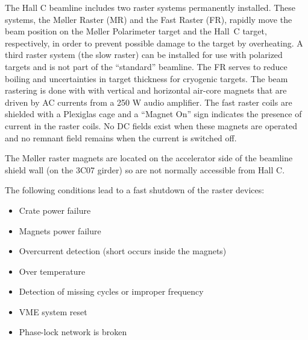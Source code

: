 


\begin{safetyen}{0}{0}

The Hall C beamline includes two raster systems permanently installed.
These systems, the M\o ller Raster (MR) and the Fast Raster (FR),
rapidly move the beam position on the M\o ller Polarimeter target and
the Hall~C target, respectively, in order to prevent possible damage
to the target by overheating. A third raster system (the slow raster)
can be installed for use with polarized targets and is not part of the
``standard'' beamline. 
 The FR serves to reduce boiling and uncertainties in target
thickness for cryogenic targets.  The beam rastering is done with with
vertical and horizontal air-core magnets that are driven by AC
currents from a 250 W audio amplifier. The fast raster coils are
shielded with a Plexiglas cage and a ``Magnet On'' sign indicates the
presence of current in the raster coils.
No DC fields exist when these magnets are operated and no remnant
field remains when the current is switched off.

The M\o ller raster magnets are located on the accelerator side of the
beamline shield wall (on the 3C07 girder) so are not normally
accessible from Hall C.

The following conditions lead to a fast shutdown of the raster devices:
\begin{itemize}
\item{Crate power failure}
\item{Magnets power failure}
\item{Overcurrent detection (short occurs inside the magnets)}
\item{Over temperature}
\item{Detection of missing cycles or improper frequency}
\item{VME system reset}
\item{Phase-lock network is broken}
\end{itemize}


\end{safetyen}
